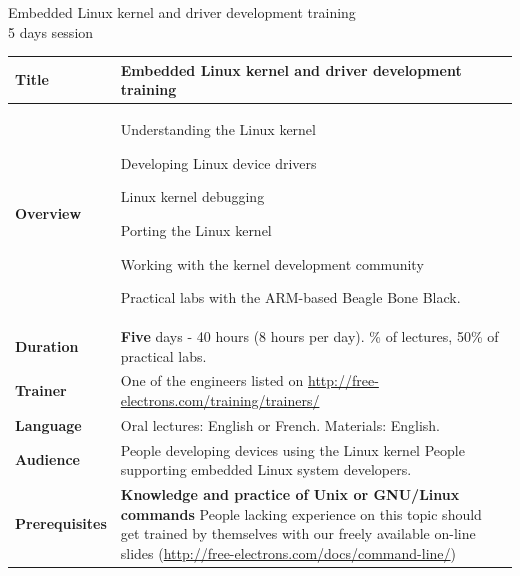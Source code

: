 \documentclass[a4paper,12pt,obeyspaces,spaces,hyphens]{article}
\begin{document}
\thispagestyle{fancy}

\setlength{\arrayrulewidth}{0.8pt}

\begin{center}
\LARGE
Embedded Linux kernel and driver development training\\
\large
5 days session
\end{center}
\vspace{1cm}

\small
{}

 {
  \begin{tabularx}{\textwidth}{|g|h|}
    {\bf Title} & Embedded Linux kernel and driver development
    training \\
    \hline

    {\bf Overview} &
    Understanding the Linux kernel \par
    Developing Linux device drivers \par
    Linux kernel debugging \par
    Porting the Linux kernel \par
    Working with the kernel development community \par
    Practical labs with the ARM-based Beagle Bone Black.\\
    \hline

    {\bf Duration} & {\bf Five} days - 40 hours (8 hours per day).
    \% of lectures, 50\% of practical labs. \\
    \hline

    {\bf Trainer} & One of the engineers listed on
    \newline \url{http://free-electrons.com/training/trainers/}\\
    \hline

    {\bf Language} & Oral lectures: English or French.
    \newline Materials: English.\\
    \hline

    {\bf Audience} & People developing devices using the Linux kernel
    \newline People supporting embedded Linux system developers. \\
    \hline

    {\bf Prerequisites} & {\bf Knowledge and practice of Unix or
      GNU/Linux commands}
    \newline People lacking experience on this topic should get
    trained by themselves with our freely available on-line slides
    (\url{http://free-electrons.com/docs/command-line/})
     \\
    \hline


\end{tabularx}}
\end{document}
